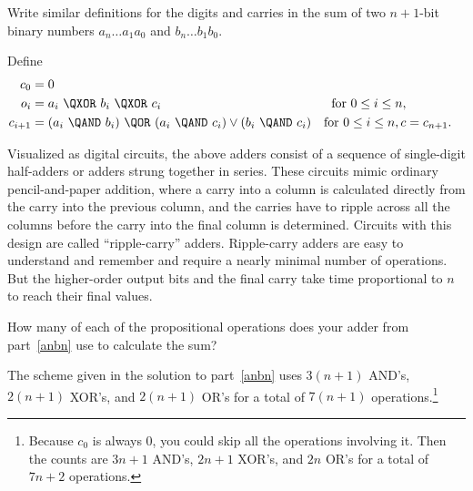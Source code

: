 \documentclass[handout]{mcs}
\begin{document}
\begin{problem}
\begin{solution}
\end{solution}

\ppart\label{anbn} Write similar definitions for the digits and carries in
the sum of two $n+1$-bit binary numbers $a_n\dots a_1a_0$ and $b_n\dots
b_1b_0$.

\begin{solution}
Define
\begin{align*}
c_0 & = 0\\
o_{i} & = a_{i}\ \QXOR\ b_{i}\ \QXOR\ c_{i}
                & \text{for } 0 \leq i \leq n,\\
c_{i+1} & = (a_i\ \QAND\ b_i)\ \QOR\ (a_i\ \QAND\ c_i) \lor (b_i\ \QAND\ c_i)
                & \text{for } 0 \leq i \leq n,
c & = c_{n+1}.
\end{align*}

\end{solution}

\eparts

Visualized as digital circuits, the above adders consist of a sequence of
single-digit half-adders or adders strung together in series.  These
circuits mimic ordinary pencil-and-paper addition, where a carry into a
column is calculated directly from the carry into the previous column, and
the carries have to ripple across all the columns before the carry into
the final column is determined.  Circuits with this design are called
``ripple-carry'' adders.  Ripple-carry adders are easy to understand and
remember and require a nearly minimal number of operations.  But the
higher-order output bits and the final carry take time proportional to $n$
to reach their final values.

\bparts 
\ppart How many of each of the propositional operations does your adder
from part~\eqref{anbn} use to calculate the sum?

\begin{solution}
The scheme given in the solution to part~\eqref{anbn} uses
  $3(n+1)$ AND's, $2(n+1)$ XOR's, and $2(n+1)$ OR's for a total of
  $7(n+1)$ operations.\footnote{Because $c_{0}$ is always 0, you could
    skip all the operations involving it.  Then the counts are $3n+1$
    AND's, $2n+1$ XOR's, and $2n$ OR's for a total of $7n+2$ operations.}

\end{solution}

\eparts
\end{problem}

\instatements{\newpage}

\end{document}
